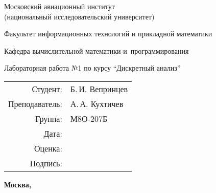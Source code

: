 \documentclass[pdf, unicode, 12pt, a4paper,oneside,fleqn]{article}
\begin{document}
\begin{titlepage}
    \begin{center}
    \bfseries
    
    {\Large Московский авиационный институт\\ (национальный исследовательский университет)
    
    }
  
    \vspace{48pt}
    
    {\large Факультет информационных технологий и прикладной математики
    }
    
    \vspace{36pt}
    
    
    {\large Кафедра вычислительной математики и~программирования
    
    }
    
    
    \vspace{48pt}
    
    Лабораторная работа №1 по курсу \enquote{Дискретный анализ}
    
    \end{center}
    
    \vspace{72pt}
    
    \begin{flushright}
    \begin{tabular}{rl}
    Студент: & Б.\,И. Вепринцев \\
    Преподаватель: & А.\,А. Кухтичев \\
    Группа: & М8О-207Б \\
    Дата: & \\
    Оценка: & \\
    Подпись: & \\
    \end{tabular}
    \end{flushright}
    
    \vfill
    
    \begin{center}
    \bfseries
    Москва, \the\year
    \end{center}
    \end{titlepage}
    
    \pagebreak


    \pagebreak
\end{document}
